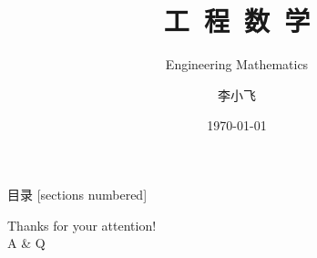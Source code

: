 \documentclass[12pt,UTF8,aspectratio=169]{beamer}
\begin{document}

\author{\myfont 李小飞}
\title{\textbf{\Huge 工~程~数~学}}
\subtitle{Engineering Mathematics}
\date{\today}

    \begin{frame}{目录}
        [sections numbered]
        \tableofcontents[hideallsubsections]
    \end{frame}%



%
%
%
  

\begin{frame}
	\begin{center}
		\huge Thanks for your attention! \\ A \& Q
	\end{center}
\end{frame}

\end{document}
